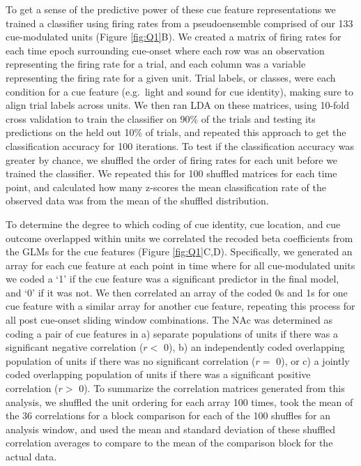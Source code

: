 \documentclass[11pt]{article}
\providecommand{\DIFadd}[1]{{\protect\color{red} \sf #1}} %
\providecommand{\DIFdel}[1]{} %
\providecommand{\DIFaddbegin}{} %
\providecommand{\DIFaddend}{} %
\providecommand{\DIFdelbegin}{} %
\providecommand{\DIFdelend}{} %
\newcommand{\DIFscaledelfig}{0.5}
\newlength{\DIFdelgraphicswidth} %
\newlength{\DIFdelgraphicsheight} %
\newcommand{\DIFaddincludegraphics}[2][]{{\color{red}\fbox{\DIFOincludegraphics[#1]{#2}}}} %
\newcommand{\DIFdelincludegraphics}[2][]{%
\sbox{\DIFdelgraphicsbox}{\DIFOincludegraphics[#1]{#2}}%
\settoboxwidth{\DIFdelgraphicswidth}{\DIFdelgraphicsbox} %
\settoboxtotalheight{\DIFdelgraphicsheight}{\DIFdelgraphicsbox} %
\scalebox{\DIFscaledelfig}{%
\parbox[b]{\DIFdelgraphicswidth}{\usebox{\DIFdelgraphicsbox}\\[-\baselineskip] \rule{\DIFdelgraphicswidth}{0em}}\llap{\resizebox{\DIFdelgraphicswidth}{\DIFdelgraphicsheight}{%
\setlength{\unitlength}{\DIFdelgraphicswidth}%
\begin{picture}(1,1)%
\thicklines\linethickness{2pt} %
{\color[rgb]{1,0,0}\put(0,0){\framebox(1,1){}}}%
{\color[rgb]{1,0,0}\put(0,0){\line( 1,1){1}}}%
{\color[rgb]{1,0,0}\put(0,1){\line(1,-1){1}}}%
\end{picture}%
}\hspace*{3pt}}} %
} %
\DeclareRobustCommand{\DIFaddbegin}{\DIFOaddbegin \let\includegraphics\DIFaddincludegraphics} %
\DeclareRobustCommand{\DIFaddend}{\DIFOaddend \let\includegraphics\DIFOincludegraphics} %
\DeclareRobustCommand{\DIFdelbegin}{\DIFOdelbegin \let\includegraphics\DIFdelincludegraphics} %
\DeclareRobustCommand{\DIFdelend}{\DIFOaddend \let\includegraphics\DIFOincludegraphics} %
\begin{document}
\DIFadd{To get a sense of the predictive power of these cue feature representations we trained a classifier using firing rates from a pseudoensemble comprised of our 133 cue-modulated units (Figure \ref{fig:Q1}B). We created a matrix of firing rates for each time epoch surrounding cue-onset where each row was an observation representing the firing rate for a trial, and each column was a variable representing the firing rate for a given unit. Trial labels, or classes, were each condition for a cue feature (e.g.\ light and sound for cue identity), making sure to align trial labels across units. We then ran LDA on these matrices, using 10-fold cross validation to train the classifier on 90\% of the trials and testing its predictions on the held out 10\% of trials, and repeated this approach to get the classification accuracy for 100 iterations. To test if the classification accuracy was greater by }\DIFaddend chance, we shuffled the \DIFdelbegin \DIFdel{trial }\DIFdelend order of firing rates for \DIFdelbegin \DIFdel{a particular unit within a time bin, and took the average of this value over }\DIFdelend \DIFaddbegin \DIFadd{each unit before we trained the classifier. We repeated this for }\DIFaddend 100 \DIFdelbegin \DIFdel{shuffles}\DIFdelend \DIFaddbegin \DIFadd{shuffled matrices for each time point, and calculated how many z-scores the mean classification rate of the observed data was from the mean of the shuffled distribution.
}

\DIFadd{To determine the degree to which coding of cue identity, cue location, and cue outcome overlapped within units we correlated the recoded beta coefficients from the GLMs for the cue features (Figure \ref{fig:Q1}C,D). Specifically, we generated an array for each cue feature at each point in time where for all cue-modulated units we coded a `1' if the cue feature was a significant predictor in the final model, and `0' if it was not. We then correlated an array of the coded 0s and 1s for one cue feature with a similar array for another cue feature, repeating this process for all post cue-onset sliding window combinations. The NAc was determined as coding a pair of cue features in a) separate populations of units if there was a significant negative correlation ($r < $ 0), b) an independently coded overlapping population of units if there was no significant correlation ($r = $ 0), or c) a jointly coded overlapping population of units if there was a significant positive correlation ($r > $ 0). To summarize the correlation matrices generated from this analysis, we shuffled the unit ordering for each array 100 times, took the mean of the 36 correlations for a block comparison for each of the 100 shuffles for an analysis window, and used the mean and standard deviation of these shuffled correlation averages to compare to the mean of the comparison block for the actual data}\DIFaddend .
\end{document}
